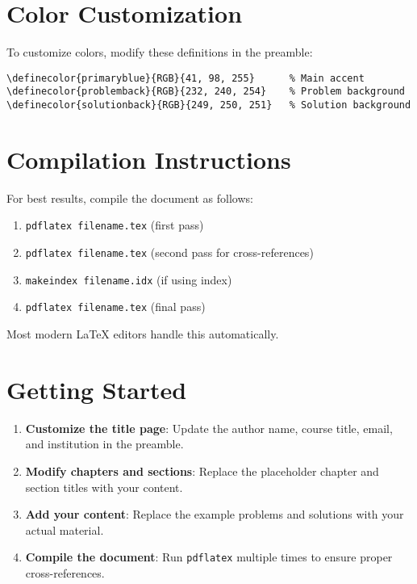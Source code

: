 \documentclass[11pt, oneside, openany]{book}
\theoremstyle{definition}
\begin{document}
\section*{Color Customization}

To customize colors, modify these definitions in the preamble:

\begin{verbatim}
\definecolor{primaryblue}{RGB}{41, 98, 255}      % Main accent
\definecolor{problemback}{RGB}{232, 240, 254}    % Problem background
\definecolor{solutionback}{RGB}{249, 250, 251}   % Solution background
\end{verbatim}

\section*{Compilation Instructions}

\begin{note}
For best results, compile the document as follows:

\begin{enumerate}
    \item \texttt{pdflatex filename.tex} (first pass)
    \item \texttt{pdflatex filename.tex} (second pass for cross-references)
    \item \texttt{makeindex filename.idx} (if using index)
    \item \texttt{pdflatex filename.tex} (final pass)
\end{enumerate}

Most modern LaTeX editors handle this automatically.
\end{note}

\section*{Getting Started}

\begin{enumerate}
    \item \textbf{Customize the title page}: Update the author name, course title, email, and institution in the preamble.
    \item \textbf{Modify chapters and sections}: Replace the placeholder chapter and section titles with your content.
    \item \textbf{Add your content}: Replace the example problems and solutions with your actual material.
    \item \textbf{Compile the document}: Run \texttt{pdflatex} multiple times to ensure proper cross-references.
\end{enumerate}
\end{document}
